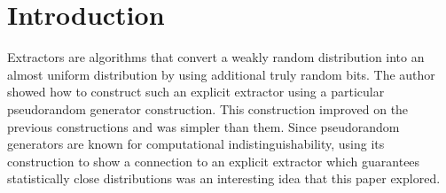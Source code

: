 \section{Introduction}
Extractors are algorithms that convert a weakly random distribution into an almost uniform distribution by using additional truly random bits. The author showed how to construct such an explicit extractor using a particular pseudorandom generator construction. This construction improved on the previous constructions and was simpler than them. Since pseudorandom generators are known for computational indistinguishability, using its construction to show a connection to an explicit extractor which guarantees statistically close distributions was an interesting idea that this paper explored.